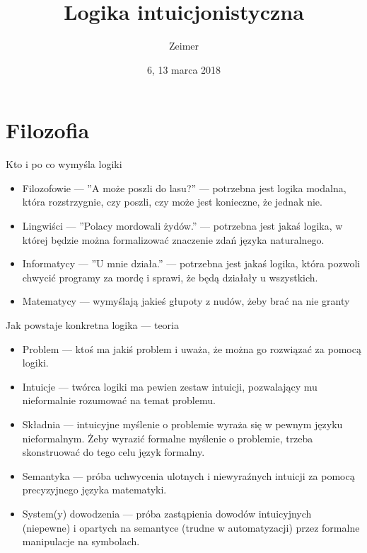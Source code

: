 \documentclass{beamer}
\title{Logika intuicjonistyczna}
\author{Zeimer}
\date{6, 13 marca 2018}
\begin{document}
\frame{\titlepage}

\frame{\tableofcontents}

\section{Filozofia}

\begin{frame}{Kto i po co wymyśla logiki}
\begin{itemize}
	\item Filozofowie — ''A może poszli do lasu?'' — potrzebna jest logika modalna, która rozstrzygnie, czy poszli, czy może jest konieczne, że jednak nie.
	\item Lingwiści — ''Polacy mordowali żydów.'' — potrzebna jest jakaś logika, w której będzie można formalizować znaczenie zdań języka naturalnego.
	\item Informatycy — ''U mnie działa.'' — potrzebna jest jakaś logika, która pozwoli chwycić programy za mordę i sprawi, że będą działały u wszystkich.
	\item Matematycy — wymyślają jakieś głupoty z nudów, żeby brać na nie granty
\end{itemize}
\end{frame}

\begin{frame}{Jak powstaje konkretna logika — teoria}
\begin{itemize}
	\item Problem — ktoś ma jakiś problem i uważa, że można go rozwiązać za pomocą logiki.
	\item Intuicje — twórca logiki ma pewien zestaw intuicji, pozwalający mu nieformalnie rozumować na temat problemu.
	\item Składnia — intuicyjne myślenie o problemie wyraża się w pewnym języku nieformalnym. Żeby wyrazić formalne myślenie o problemie, trzeba skonstruować do tego celu język formalny.
	\item Semantyka — próba uchwycenia ulotnych i niewyraźnych intuicji za pomocą precyzyjnego języka matematyki.
	\item System(y) dowodzenia — próba zastąpienia dowodów intuicyjnych (niepewne) i opartych na semantyce (trudne w automatyzacji) przez formalne manipulacje na symbolach.
\end{itemize}
\end{frame}
\end{document}
